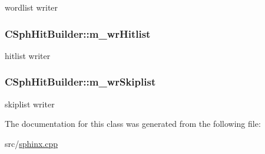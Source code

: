 wordlist writer 

\hypertarget{classCSphHitBuilder_ada1e5504058e0b142ea1e59856308bae}{
\subsubsection[{m\-\_\-wr\-Hitlist}]{ C\-Sph\-Hit\-Builder\-::m\-\_\-wr\-Hitlist\hspace{0.3cm}{\ttfamily [private]}}}\label{classCSphHitBuilder_ada1e5504058e0b142ea1e59856308bae}


hitlist writer 

\hypertarget{classCSphHitBuilder_a25cffe2489b5a47bcbefae0836ed5dad}{
\subsubsection[{m\-\_\-wr\-Skiplist}]{ C\-Sph\-Hit\-Builder\-::m\-\_\-wr\-Skiplist\hspace{0.3cm}{\ttfamily [private]}}}\label{classCSphHitBuilder_a25cffe2489b5a47bcbefae0836ed5dad}


skiplist writer 



The documentation for this class was generated from the following file\-:\begin{DoxyCompactItemize}
\item 
src/\hyperlink{sphinx_8cpp}{sphinx.\-cpp}\end{DoxyCompactItemize}
